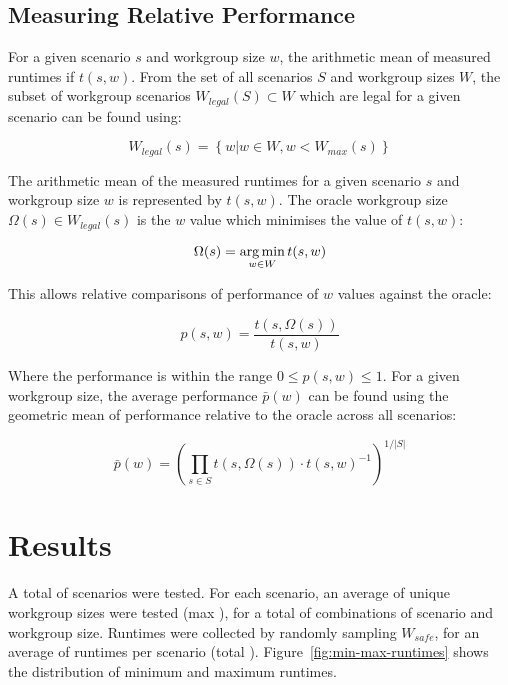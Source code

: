 \subsection{Measuring Relative Performance}


For a given scenario $s$ and workgroup size $w$, the arithmetic mean
of measured runtimes if $t(s,w)$. From the set of all scenarios $S$
and workgroup sizes $W$, the subset of workgroup scenarios
$W_{legal}(S) \subset W$ which are legal for a given scenario can be
found using:

\begin{equation}
W_{legal}(s) = \left\{w | w \in W, w < W_{max}(s) \right\}
\end{equation}

The arithmetic mean of the measured runtimes for a given scenario $s$
and workgroup size $w$ is represented by $t(s,w)$. The oracle
workgroup size $\Omega(s) \in W_{legal}(s)$ is the $w$ value which
minimises the value of $t(s,w)$:

\begin{equation}
\Omega(s) = \operatorname*{arg\,min}_{w \in W} t(s,w)
\end{equation}

This allows relative comparisons of performance of $w$ values against
the oracle:

\begin{equation}
p(s,w) = \frac{t(s,\Omega(s))}{t(s,w)}
\end{equation}

Where the performance is within the range $0 \le p(s,w) \le 1$. For a
given workgroup size, the average performance $\bar{p}(w)$ can be
found using the geometric mean of performance relative to the oracle
across all scenarios:

\begin{equation}
\bar{p}(w) =
\left(
  \prod_{s \in S} t(s,\Omega(s)) \cdot t(s,w)^{-1}
\right)^{1/|S|}
\end{equation}


\section{Results}

A total of  scenarios were tested. For each
scenario, an average of  unique workgroup
sizes were tested (max ), for a total of
 combinations of scenario and workgroup
size. Runtimes were collected by randomly sampling $W_{safe}$, for an
average of  runtimes per scenario (total
). Figure~\ref{fig:min-max-runtimes} shows the
distribution of minimum and maximum runtimes.

